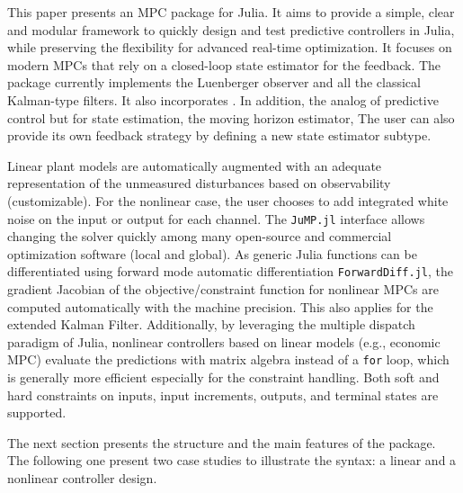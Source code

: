 This paper presents an MPC package for Julia. It aims to provide a simple, clear and modular framework to quickly design and test predictive controllers in Julia, while preserving the flexibility for advanced real-time optimization. It focuses on modern MPCs that rely on a closed-loop state estimator for the feedback. The package currently implements the Luenberger observer and all the classical Kalman-type filters. It also incorporates . In addition, the analog of predictive control but for state estimation, the moving horizon estimator,  The user can also provide its own feedback strategy by defining a new state estimator subtype.

Linear plant models are automatically augmented with an adequate representation of the unmeasured disturbances based on observability (customizable). For the nonlinear case, the user chooses to add integrated white noise on the input or output for each channel. The \texttt{JuMP.jl} interface allows changing the solver quickly among  many open-source and commercial optimization software (local and global). As generic Julia functions can be differentiated using forward mode automatic differentiation \texttt{ForwardDiff.jl}\added{)}, the gradient Jacobian of the objective/constraint function for nonlinear MPCs are computed automatically with the machine precision. This also applies for the extended Kalman Filter. Additionally, by leveraging the multiple dispatch paradigm of Julia, nonlinear controllers based on linear models (e.g., economic MPC) evaluate the predictions with matrix algebra instead of a \texttt{for} loop, which is generally more efficient especially for the constraint handling. Both soft and hard constraints on inputs, input increments, outputs, and terminal states are supported.

The next section presents the structure and the main features of the package. The following one present two case studies to illustrate the syntax: a linear and a nonlinear controller design.